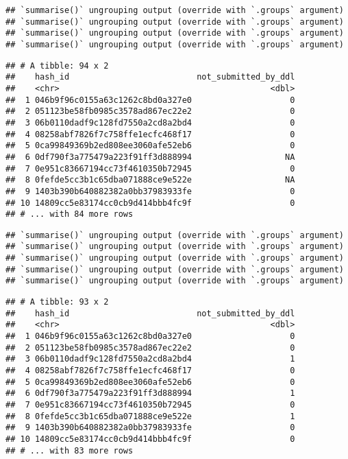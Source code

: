 \documentclass[
]{article}
\begin{document}
\begin{verbatim}
## `summarise()` ungrouping output (override with `.groups` argument)
## `summarise()` ungrouping output (override with `.groups` argument)
## `summarise()` ungrouping output (override with `.groups` argument)
## `summarise()` ungrouping output (override with `.groups` argument)
\end{verbatim}

\begin{verbatim}
## # A tibble: 94 x 2
##    hash_id                          not_submitted_by_ddl
##    <chr>                                           <dbl>
##  1 046b9f96c0155a63c1262c8bd0a327e0                    0
##  2 051123be58fb0985c3578ad867ec22e2                    0
##  3 06b0110dadf9c128fd7550a2cd8a2bd4                    0
##  4 08258abf7826f7c758ffe1ecfc468f17                    0
##  5 0ca99849369b2ed808ee3060afe52eb6                    0
##  6 0df790f3a775479a223f91ff3d888994                   NA
##  7 0e951c83667194cc73f4610350b72945                    0
##  8 0fefde5cc3b1c65dba071888ce9e522e                   NA
##  9 1403b390b640882382a0bb37983933fe                    0
## 10 14809cc5e83174cc0cb9d414bbb4fc9f                    0
## # ... with 84 more rows
\end{verbatim}

\begin{verbatim}
## `summarise()` ungrouping output (override with `.groups` argument)
## `summarise()` ungrouping output (override with `.groups` argument)
## `summarise()` ungrouping output (override with `.groups` argument)
## `summarise()` ungrouping output (override with `.groups` argument)
## `summarise()` ungrouping output (override with `.groups` argument)
\end{verbatim}

\begin{verbatim}
## # A tibble: 93 x 2
##    hash_id                          not_submitted_by_ddl
##    <chr>                                           <dbl>
##  1 046b9f96c0155a63c1262c8bd0a327e0                    0
##  2 051123be58fb0985c3578ad867ec22e2                    0
##  3 06b0110dadf9c128fd7550a2cd8a2bd4                    1
##  4 08258abf7826f7c758ffe1ecfc468f17                    0
##  5 0ca99849369b2ed808ee3060afe52eb6                    0
##  6 0df790f3a775479a223f91ff3d888994                    1
##  7 0e951c83667194cc73f4610350b72945                    0
##  8 0fefde5cc3b1c65dba071888ce9e522e                    1
##  9 1403b390b640882382a0bb37983933fe                    0
## 10 14809cc5e83174cc0cb9d414bbb4fc9f                    0
## # ... with 83 more rows
\end{verbatim}
\end{document}
